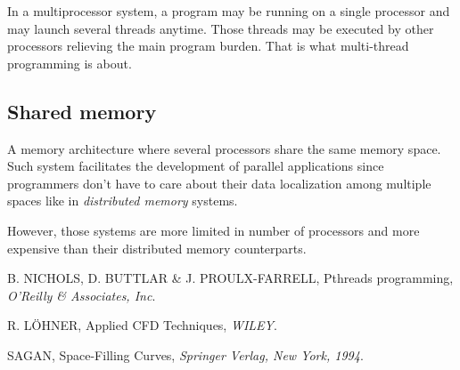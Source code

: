 \documentclass[a4paper,12pt]{article}
\begin{document}
In a multiprocessor system, a program may be running on a single processor and may launch several threads anytime. Those threads may be executed by other processors relieving the main program burden. That is what multi-thread programming is about.

\subsection{Shared memory}
A memory architecture where several processors share the same memory space. Such system facilitates the development of parallel applications since programmers don't have to care about their data localization among multiple spaces like in \emph{distributed memory} systems.

However, those systems are more limited in number of processors and more expensive than their distributed memory counterparts.


%
%


\begin{thebibliography}{99}
\small

	B. NICHOLS, D. BUTTLAR \& J. PROULX-FARRELL,
	Pthreads programming,
	\emph{O'Reilly \& Associates, Inc}.

	R. L\"OHNER,
	Applied CFD Techniques,
	\emph{WILEY}.

	SAGAN,
	Space-Filling Curves,
	\emph{Springer Verlag, New York, 1994}.

\end{thebibliography}
\end{document}

